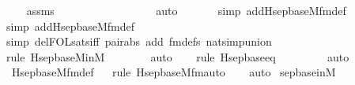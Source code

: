 \begin{isabellebody}
\ \ \isamarkupfalse%
\ assms\ \isanewline
\ \ \ \ \ \ \ \ \ \ \ \ \ \ \ \isamarkupfalse%
\ auto{\isacharbrackleft}{\kern0pt}{}{\isacharbrackright}{\kern0pt}\isanewline
\ \ \ \ \ \ \isamarkupfalse%
{\isacharparenleft}{\kern0pt}simp\ add{\isacharcolon}{\kern0pt}Hsep{\isacharunderscore}{\kern0pt}base{\isacharunderscore}{\kern0pt}M{\isacharunderscore}{\kern0pt}fm{\isacharunderscore}{\kern0pt}def{\isacharparenright}{\kern0pt}\isanewline
\ \ \ \ \ \isamarkupfalse%
{\isacharparenleft}{\kern0pt}simp\ add{\isacharcolon}{\kern0pt}Hsep{\isacharunderscore}{\kern0pt}base{\isacharunderscore}{\kern0pt}M{\isacharunderscore}{\kern0pt}fm{\isacharunderscore}{\kern0pt}def{\isacharparenright}{\kern0pt}\isanewline
\ \ \ \ \ \isamarkupfalse%
{\isacharparenleft}{\kern0pt}simp\ del{\isacharcolon}{\kern0pt}FOL{\isacharunderscore}{\kern0pt}sats{\isacharunderscore}{\kern0pt}iff\ pair{\isacharunderscore}{\kern0pt}abs\ add{\isacharcolon}{\kern0pt}\ fm{\isacharunderscore}{\kern0pt}defs\ nat{\isacharunderscore}{\kern0pt}simp{\isacharunderscore}{\kern0pt}union{\isacharparenright}{\kern0pt}\ \ \isanewline
\ \ \ \ \isamarkupfalse%
{\isacharparenleft}{\kern0pt}rule\ Hsep{\isacharunderscore}{\kern0pt}base{\isacharunderscore}{\kern0pt}M{\isacharunderscore}{\kern0pt}in{\isacharunderscore}{\kern0pt}M{\isacharparenright}{\kern0pt}\isanewline
\ \ \ \ \ \ \isamarkupfalse%
\ auto{\isacharbrackleft}{\kern0pt}{}{\isacharbrackright}{\kern0pt}\isanewline
\ \ \ \isamarkupfalse%
{\isacharparenleft}{\kern0pt}rule\ Hsep{\isacharunderscore}{\kern0pt}base{\isacharunderscore}{\kern0pt}eq{\isacharparenright}{\kern0pt}\isanewline
\ \ \ \ \ \ \ \isamarkupfalse%
\ auto{\isacharbrackleft}{\kern0pt}{}{\isacharbrackright}{\kern0pt}\isanewline
\ \ \isamarkupfalse%
\ Hsep{\isacharunderscore}{\kern0pt}base{\isacharunderscore}{\kern0pt}M{\isacharunderscore}{\kern0pt}fm{\isacharunderscore}{\kern0pt}def\isanewline
\ \ \isamarkupfalse%
{\isacharparenleft}{\kern0pt}rule\ Hsep{\isacharunderscore}{\kern0pt}base{\isacharunderscore}{\kern0pt}M{\isacharunderscore}{\kern0pt}fm{\isacharunderscore}{\kern0pt}auto{\isacharparenright}{\kern0pt}\isanewline
\ \ \isamarkupfalse%
\ auto%
\endisatagproof
{\isafoldproof}%
%
\isadelimproof
\isanewline
%
\endisadelimproof
\isanewline
{}\isamarkupfalse%
\ sep{\isacharunderscore}{\kern0pt}base{\isacharunderscore}{\kern0pt}in{\isacharunderscore}{\kern0pt}M\ {\isacharcolon}{\kern0pt}\ \isanewline

\end{isabellebody}
